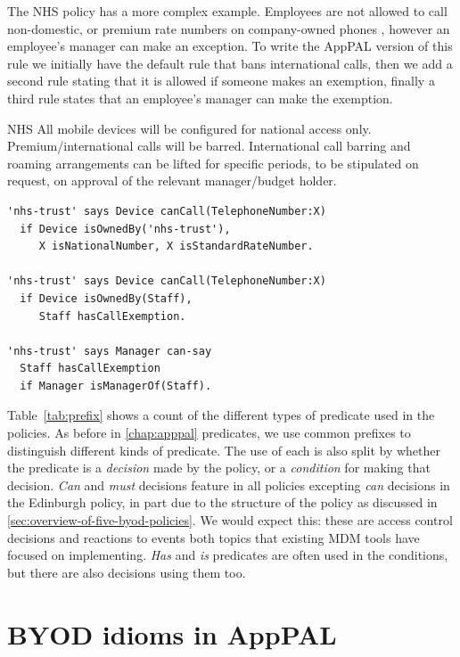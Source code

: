 \documentclass[thesis.tex]{subfiles}
\begin{document}
The NHS policy has a more complex example. Employees are not
allowed to call non-domestic, or premium rate numbers on company-owned
phones , however an employee's manager can make an exception.
To write the AppPAL version of this rule we initially have the default
rule that bans international calls, then we add a second rule stating that it is
allowed if someone makes an exemption, finally a third rule states that an employee's manager 
can make the exemption.

\begin{policyrule}{NHS}
  All mobile devices will be configured for national access only. Premium/international calls will be barred.
  International call barring and roaming arrangements can be lifted for specific periods, to be stipulated on request, on approval of the relevant manager/budget holder.
  \normalfont
  \begin{lstlisting}
'nhs-trust' says Device canCall(TelephoneNumber:X)
  if Device isOwnedBy('nhs-trust'),
     X isNationalNumber, X isStandardRateNumber.

'nhs-trust' says Device canCall(TelephoneNumber:X)
  if Device isOwnedBy(Staff),
     Staff hasCallExemption.

'nhs-trust' says Manager can-say
  Staff hasCallExemption
  if Manager isManagerOf(Staff).
  \end{lstlisting}
\end{policyrule}

Table~\ref{tab:prefix} shows a count of the different types of
predicate used in the policies.  As before in \autoref{chap:apppal}
predicates, we use common prefixes to distinguish different kinds of
predicate.  The use of each is also split by whether the predicate is
a \emph{decision} made by the policy, or a \emph{condition} for making
that decision. \emph{Can} and \emph{must} decisions feature in all
policies excepting \emph{can} decisions in the Edinburgh policy, in
part due to the structure of the policy as discussed in
\autoref{sec:overview-of-five-byod-policies}. We would expect this: these are access
control decisions and reactions to events both topics that existing
\ac{MDM} tools have focused on implementing. \emph{Has} and \emph{is}
predicates are often used in the conditions, but there are also
decisions using them too.

\section{BYOD idioms in AppPAL}
\label{sec:common_concerns}
\end{document}
